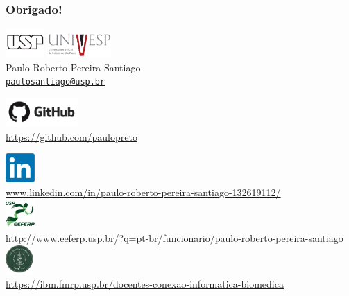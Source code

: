\documentclass{beamer}
\begin{document}
\begin{frame}
  \frametitle{Obrigado!}
  \centering

  \includegraphics[height=3em]{usp-logo-png-1.png}\hspace{2mm}
  \includegraphics[height=2.5em]{univesp.png}\\
  Paulo Roberto Pereira Santiago\\
  \href{mailto:paulosantiago@usp.br}{\texttt{paulosantiago@usp.br}}

  
  \vspace{5mm} %
  \begin{tiny}
  \href{https://github.com/paulopreto}{\includegraphics[height=3em]{github-logo.png}\\
  https://github.com/paulopreto}
  
  \href{www.linkedin.com/in/paulo-roberto-pereira-santiago-132619112/}{\includegraphics[height=3em]{LinkedIn_logo.png}\\ www.linkedin.com/in/paulo-roberto-pereira-santiago-132619112/}\\
  \href{http://www.eeferp.usp.br/?q=pt-br/funcionario/paulo-roberto-pereira-santiago}{\includegraphics[height=3em]{eeferp.jpeg}\\ http://www.eeferp.usp.br/?q=pt-br/funcionario/paulo-roberto-pereira-santiago}\\
  \href{https://ibm.fmrp.usp.br/docentes-conexao-informatica-biomedica}{\includegraphics[height=3em]{Infor-IBm-logo.png}\\ https://ibm.fmrp.usp.br/docentes-conexao-informatica-biomedica}
  \end{tiny}
\end{frame}
\end{document}
